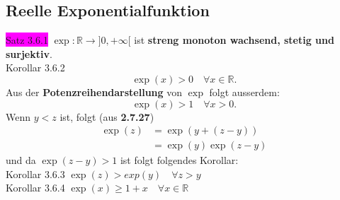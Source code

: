 \documentclass[landscape, 10pt]{article}
\newcommand{\R}{\mathbb{R}}
\begin{document}
\begin{multicols}{3}
       \subsection{Reelle Exponentialfunktion}
              \colorbox{magenta}{Satz 3.6.1} 
                     \textcolor{NavyBlue}{
                     $\exp:\R\longrightarrow]0,+\infty[$}
                     ist \textbf{streng monoton wachsend, stetig und surjektiv}.\\
              \colorbox{BurntOrange}{Korollar 3.6.2} 
                     \begin{equation*}
                            \exp(x)>0\quad\forall x\in\R.
                     \end{equation*}
                     Aus der \textbf{Potenzreihendarstellung} von 
                     \textcolor{NavyBlue}{$\exp$} folgt ausserdem: 
                     \begin{equation*}
                            \exp(x)>1\quad\forall x>0.
                     \end{equation*} 
                     Wenn \textcolor{NavyBlue}{$y<z$} ist, folgt 
                     (aus \textbf{2.7.27})
                     \begin{align*}
                            \exp(z)&=\exp(y+(z-y))\\
                                   &=\exp(y)\exp(z-y)
                     \end{align*}
                     und da \textcolor{NavyBlue}{$\exp(z-y)>1$} 
                     ist folgt folgendes Korollar:\\
              \colorbox{BurntOrange}{Korollar 3.6.3} 
                     \textcolor{NavyBlue}{
                     $\exp(z)>exp(y)\quad\forall z>y$}\\
              \colorbox{BurntOrange}{Korollar 3.6.4} 
                     \textcolor{NavyBlue}{
                     $\exp(x)\geqslant1+x\quad\forall x\in\R$}\\


\end{multicols}
\end{document}
